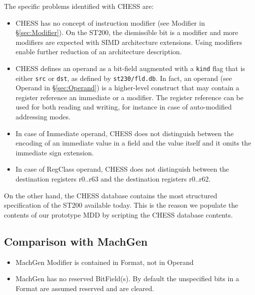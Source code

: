 \documentclass[11pt,a4paper]{article}
\begin{document}
The specific problems identified with CHESS are: \begin{itemize}

\item CHESS has no concept of instruction modifier (see Modifier in
\S\ref{sec:Modifier}). On the ST200, the dismissible bit is a modifier and more
modifiers are expected with SIMD architecture extensions. Using modifiers enable
further reduction of an architecture description.

\item CHESS defines an operand as a bit-field augmented with a \texttt{kind}
flag that is either \texttt{src} or \texttt{dst}, as defined by
\texttt{st230/fld.db}. In fact, an operand (see Operand in \S\ref{sec:Operand})
is a higher-level construct that may contain a register reference an immediate
or a modifier. The register reference can be used for both reading and writing,
for instance in case of auto-modified addressing modes.

\item In case of Immediate operand, CHESS does not distinguish between the
encoding of an immediate value in a field and the value itself and it omits the
immediate sign extension.

\item In case of RegClass operand, CHESS does not distinguish between the
destination registers r0..r63 and the destination registers r0..r62.

\end{itemize}

On the other hand, the CHESS database contains the most structured specification
of the ST200 available today. This is the reason we populate the contents of our
prototype MDD by scripting the CHESS database contents.


\subsection{Comparison with MachGen}

\begin{itemize}

\item MachGen Modifier is contained in Format, not in Operand

\item MachGen has no reserved BitField(s). By default the unspecified bits in a
Format are assumed reserved and are cleared.

\end{itemize}
\end{document}
